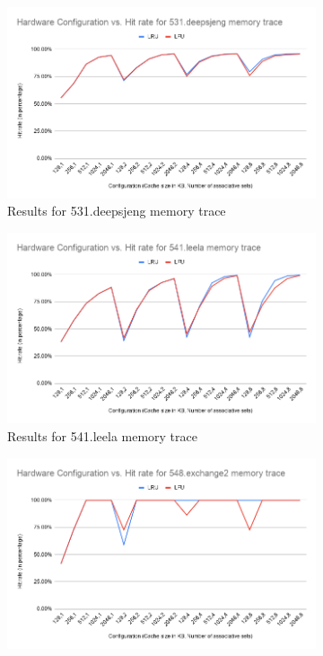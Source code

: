 \documentclass[letterpaper, 11pt]{article}
\begin{document}
	\begin{figure}[ht!]
	\centering
	\begin{subfigure}[b]{.48\linewidth}
		\includegraphics[width=\textwidth]{531_deepsjeng_results.png}
		\caption{Results for 531.deepsjeng memory trace}
		\label{fig2a}
	\end{subfigure}
	\begin{subfigure}[b]{.48\linewidth}
		\includegraphics[width=\textwidth]{541_leela_results.png}
		\caption{Results for 541.leela memory trace}
		\label{fig2b}
	\end{subfigure}
	\begin{subfigure}[b]{.48\linewidth}
		\includegraphics[width=\textwidth]{548_exchange2_results.png}

\end{subfigure}
\end{figure}
\end{document}
